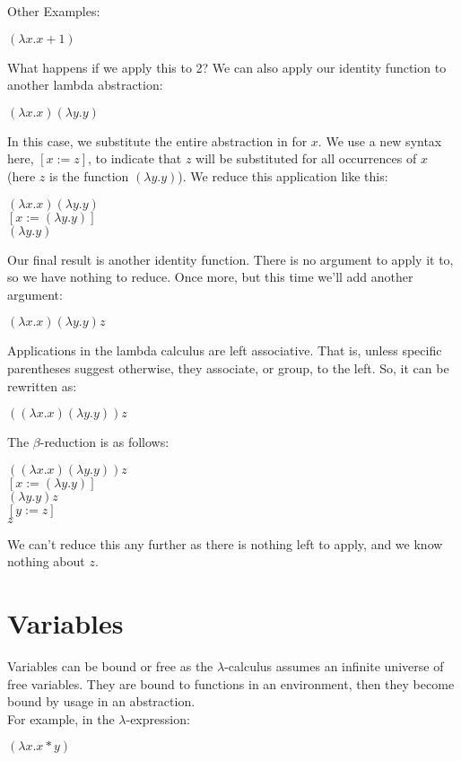 \documentclass[11pt]{article}
\begin{document}
Other Examples: 
\begin{center}
$(\lambda x.x+1)$
\end{center}
What happens if we apply this to 2? 
We can also apply our identity function to another lambda abstraction:
\begin{center}
$(\lambda x.x)(\lambda y.y)$
\end{center}

In this case, we substitute the entire abstraction in for $x$. We use a new syntax here, $[x := z]$, to indicate that $z$ will be substituted for all occurrences of $x$ (here $z$ is the function $(\lambda y.y)$). We reduce this application like this:
\begin{center}
$(\lambda x.x)(\lambda y.y)$ \\
$[x  := (\lambda y.y)]$\\
\hspace{.4in}$(\lambda y.y)$\\
\end{center}
Our final result is another identity function. There is no argument to apply it to, so we have nothing to reduce.
Once more, but this time we’ll add another argument:
\begin{center}
$(\lambda x.x)(\lambda y.y)z$
\end{center}

Applications in the lambda calculus are left associative. That is, unless specific parentheses suggest otherwise, they associate, or group, to the left. So, it can be rewritten as:
\begin{center}
$((\lambda x.x)(\lambda y.y)) z$
\end{center}
The $\beta$-reduction is as follows:
\begin{center}
$((\lambda x.x)(\lambda y.y)) z$ \\
\hspace{.22in}$[x := ( \lambda y. y) ] $\\
\hspace{.58in}$ (\lambda y.y) z $ \\
\hspace{.58in}$[y:= z ] $\\
\hspace{1in}$z$ \\
\end{center}
We can't reduce this any further as there is nothing left to apply, and we know nothing about $z$.
\section{Variables}
Variables can be bound or free as the $\lambda$-calculus assumes an infinite universe of free
variables. They are bound to functions in an environment, then they become bound by usage in an abstraction. \\
For example, in the $\lambda$-expression:
\begin{center}
$(\lambda x. x*y)$
\end{center}
\end{document}
